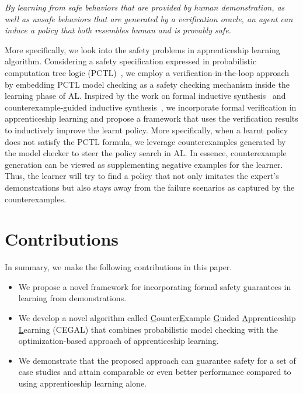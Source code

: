 \emph {
By learning from safe behaviors that are provided by human demonstration, as well as unsafe behaviors that are generated by a verification oracle, an agent can induce a policy that both resembles human and is provably safe. 
} 

More specifically, we look into the safety problems in apprenticeship learning algorithm. Considering a safety specification expressed in probabilistic computation tree logic (PCTL)~\cite{Hansson1994}, we employ a verification-in-the-loop approach by embedding PCTL model checking as a safety checking mechanism inside the learning phase of AL. Inspired by the work on formal inductive synthesis~\cite{jha-ai2017} and counterexample-guided inductive synthesis~\cite{CEGIS}, we incorporate formal verification in apprenticeship learning and propose a framework that uses the verification results to  inductively improve the learnt policy. 
More specifically, when a learnt policy does not satisfy the PCTL formula, we leverage counterexamples generated by the model checker to steer the policy search in AL. 
In essence, counterexample generation can be viewed as supplementing negative examples for the learner. 
Thus, the learner will try to find a policy that not only imitates the expert's demonstrations but also stays away from the failure scenarios as captured by the counterexamples. 


\section{Contributions}
In summary, we make the following contributions in this paper. 
\begin{itemize}
\item We propose a novel framework for incorporating formal safety guarantees in learning from demonstrations.
\item We develop a novel algorithm called \underline{C}ounter\underline{E}xample \underline{G}uided \underline{A}pprenticeship \underline{L}earning (CEGAL) that combines probabilistic model checking with the optimization-based approach of apprenticeship learning. 
\item We demonstrate that the proposed approach can guarantee safety for a set of case studies and attain comparable or even better performance compared to using apprenticeship learning alone.
\end{itemize}


